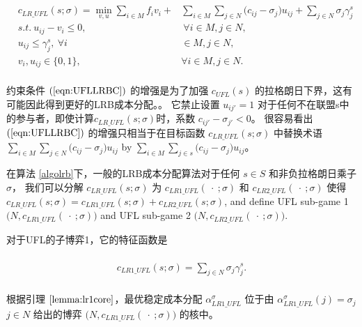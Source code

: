 \documentclass[UTF8]{article}
\begin{document}
\begin{定义}
      \begin{eqnarray*}\label{eqn:LRPGCF}
      \begin{aligned}
      \begin{split}
      c_{LR\_UFL}(s;\sigma) = \min_{v,u} \sum_{i \in M} f_iv_i + &\sum_{i \in M} \sum_{j \in N} \big(c_{ij} - \sigma_{j}\big)u_{ij} + \sum_{j \in N} \sigma_j \gamma_j^s\\
      s.t.~u_{ij} - v_i \leq 0,&~\forall i \in M, j \in N,\\
      u_{ij} \leq \gamma_j^s,~\forall i& \in M, j \in N,\\
      v_i,u_{ij} \in \{0,1\},~&\forall i \in M, j \in N.
      \end{split}
      \end{aligned}
      \end{eqnarray*}

      约束条件 $(\ref{eqn:UFLLRBC})$ 的增强是为了加强 $c_{UFL}(s)$ 的拉格朗日下界，这有可能因此得到更好的LRB成本分配。。
      它禁止设置 $u_{ij'}=1$ 对于任何不在联盟s中的参与者，即使计算$c_{LR\_UFL}(s;\sigma)$时，系数 $c_{ij'}- \sigma_{j'}<0$。
      很容易看出 $(\ref{eqn:UFLLRBC})$ 的增强只相当于在目标函数 $c_{LR\_UFL}(s;\sigma)$ 中替换术语 $\sum_{i \in M} \sum_{j \in N} \big(c_{ij} - \sigma_{j}\big)u_{ij}$ by $\sum_{i \in M} \sum_{j \in s} \big(c_{ij} - \sigma_{j}\big)u_{ij}$。

      在算法 \ref{algolrb}下，一般的LRB成本分配算法对于任何 $s \in S$ 和非负拉格朗日乘子 $\sigma$， 我们可以分解 $c_{LR\_UFL}(s;\sigma)$ 为 $c_{LR1\_UFL}(\ \cdot \ ;\sigma)$ 和 $c_{LR2\_UFL}(\ \cdot \ ;\sigma)$ 使得 $c_{LR\_UFL}(s;\sigma) = c_{LR1\_UFL}(s;\sigma) + c_{LR2\_UFL}(s;\sigma)$, and define UFL sub-game 1 $\big(N,c_{LR1\_UFL}(\ \cdot \ ;\sigma)\big)$ and UFL sub-game 2  $\big(N,c_{LR2\_UFL}(\ \cdot \ ;\sigma)\big)$.

      对于UFL的子博弈1，它的特征函数是

      \begin{eqnarray}\label{eqn:UFLCFsub1}
      \begin{aligned}
      \begin{split}
      c_{LR1\_UFL}(s;\sigma) = \sum_{j \in N} \sigma_j \gamma_j^s.
      \end{split}
      \end{aligned}
      \end{eqnarray}

      根据引理 $\ref{lemma:lr1core}$，最优稳定成本分配 $\alpha_{LR1\_UFL}^{\sigma}$ 位于由 $\alpha_{LR1\_UFL}^{\sigma}(j) = \sigma_j$ $j \in N$ 给出的博弈 $\big(N, c_{LR1\_UFL}(\ \cdot \ ;\sigma)\big)$ 的核中。


\end{定义}
\end{document}

